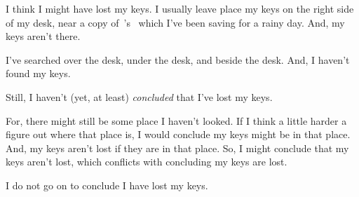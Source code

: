 \begin{note}
  \begin{illustration}
    \label{illu:lost-key}
    I think I might have lost my keys.
    I usually leave place my keys on the right side of my desk, near a copy of~\citeauthor{Vickers:1989tr}'s~ which I've been saving for a rainy day.
    And, my keys aren't there.

    I've searched over the desk, under the desk, and beside the desk.
    And, I haven't found my keys.

    Still, I haven't (yet, at least) \emph{concluded} that I've lost my keys.

    For, there might still be some place I haven't looked.
    If I think a little harder a figure out where that place is, I would conclude my keys might be in that place.
    And, my keys aren't lost if they are in that place.
    So, I might conclude that my keys aren't lost, which conflicts with concluding my keys are lost.

    I do not go on to conclude I have lost my keys.
  \end{illustration}
\end{note}

